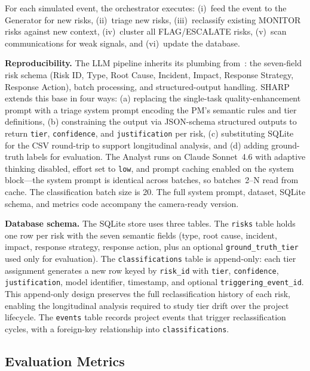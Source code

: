 \documentclass[runningheads]{llncs}
\begin{document}
For each simulated event, the orchestrator executes: (i)~feed the event to the Generator for new risks, (ii)~triage new risks, (iii)~reclassify existing MONITOR risks against new context, (iv)~cluster all FLAG/ESCALATE risks, (v)~scan communications for weak signals, and (vi)~update the database.

\textbf{Reproducibility.} The LLM pipeline inherits its plumbing from~\cite{bara2025augmenting}: the seven-field risk schema (Risk ID, Type, Root Cause, Incident, Impact, Response Strategy, Response Action), batch processing, and structured-output handling. SHARP extends this base in four ways: (a) replacing the single-task quality-enhancement prompt with a triage system prompt encoding the PM's semantic rules and tier definitions, (b) constraining the output via JSON-schema structured outputs to return \texttt{tier}, \texttt{confidence}, and \texttt{justification} per risk, (c) substituting SQLite for the CSV round-trip to support longitudinal analysis, and (d) adding ground-truth labels for evaluation. The Analyst runs on Claude Sonnet~4.6 with adaptive thinking disabled, effort set to \texttt{low}, and prompt caching enabled on the system block---the system prompt is identical across batches, so batches~2--N read from cache. The classification batch size is 20. The full system prompt, dataset, SQLite schema, and metrics code accompany the camera-ready version.

\textbf{Database schema.} The SQLite store uses three tables. The \texttt{risks} table holds one row per risk with the seven semantic fields (type, root cause, incident, impact, response strategy, response action, plus an optional \texttt{ground\_truth\_tier} used only for evaluation). The \texttt{classifications} table is append-only: each tier assignment generates a new row keyed by \texttt{risk\_id} with \texttt{tier}, \texttt{confidence}, \texttt{justification}, model identifier, timestamp, and optional \texttt{triggering\_event\_id}. This append-only design preserves the full reclassification history of each risk, enabling the longitudinal analysis required to study tier drift over the project lifecycle. The \texttt{events} table records project events that trigger reclassification cycles, with a foreign-key relationship into \texttt{classifications}.

\subsection{Evaluation Metrics}
\end{document}
